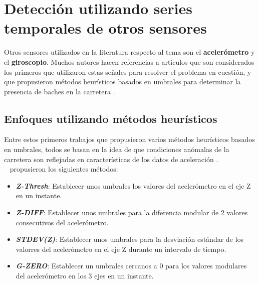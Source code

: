 
\section{Detección utilizando series temporales de otros sensores}
	Otros sensores utilizados en la literatura respecto al tema son el \textbf{acelerómetro} y el \textbf{giroscopio}. Muchos
	autores hacen referencias a artículos que son considerados los primeros que utilizaron estas señales para resolver el 
	problema en cuestión, y que propusieron métodos heurísticos basados en umbrales para determinar la presencia de
	baches en la carretera .

	\subsection{Enfoques utilizando métodos heurísticos}
		Entre estos primeros trabajos que propusieron varios métodos heurísticos basados en umbrales, todos se basan en la idea
		de que condiciones anómalas de la carretera son reflejadas en características de los datos de aceleración .\\
		~\textcite{mednis2011real} propusieron los siguientes métodos:\\

		\begin{itemize}
			\item  \emph{\textbf {Z-Thresh}}: Establecer unos umbrales los valores del acelerómetro en el eje Z en un instante.\\
			\item \emph{\textbf {Z-DIFF}}: Establecer unos umbrales para la diferencia modular de 2 valores consecutivos del
				acelerómetro.\\
			\item \emph{\textbf {STDEV(Z)}}: Establecer unos umbrales para la desviación estándar de los valorres del acelerómetro en
				el eje Z durante un intervalo de tiempo.\\ 
			\item \emph{\textbf {G-ZERO}}: Establecer un umbrales cercanos a 0 para los valores modulares del acelerómetro
				en los 3 ejes en un instante.\\
		\end{itemize}

